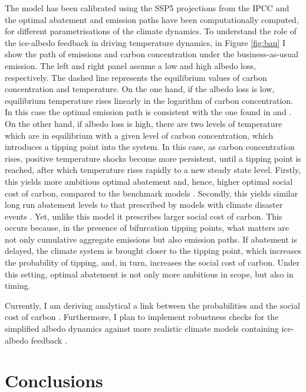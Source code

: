 \documentclass[12pt]{article}
\begin{document}
The model has been calibrated using the SSP5 projections from the IPCC \citep{kriegler_fossil-fueled_2017} and the optimal abatement and emission paths have been computationally computed, for different parametrisations of the climate dynamics. To understand the role of the ice-albedo feedback in driving temperature dynamics, in Figure \ref{fig:bau} I show the path of emissions and carbon concentration under the business-as-usual emission. The left and right panel assume a low and high albedo loss, respectively. The dashed line represents the equilibrium values of carbon concentration and temperature. On the one hand, if the albedo loss is low, equilibrium temperature rises linearly in the logarithm of carbon concentration. In this case the optimal emission path is consistent with the one found in \cite{nordhaus_revisiting_2017} and \cite{hambel_optimal_2021}. On the other hand, if albedo loss is high, there are two levels of temperature which are in equilibrium with a given level of carbon concentration, which introduces a tipping point into the system. In this case, as carbon concentration rises, positive temperature shocks become more persistent, until a tipping point is reached, after which temperature rises rapidly to a new steady state level. Firstly, this yields more ambitious optimal abatement and, hence, higher optimal social cost of carbon, compared to the benchmark models \citep{nordhaus_revisiting_2017,hambel_optimal_2021}. Secondly, this yields similar long run abatement levels to that prescribed by models with climate disaster events \citep{van_den_bremer_risk-adjusted_2021,dietz_economic_2021, lin_social_2023}. Yet, unlike this model it prescribes larger social cost of carbon. This occurs because, in the presence of bifurcation tipping points, what matters are not only cumulative aggregate emissions but also emission paths. If abatement is delayed, the climate system is brought closer to the tipping point, which increases the probability of tipping, and, in turn, increases the social cost of carbon. Under this setting, optimal abatement is not only more ambitious in scope, but also in timing. 

Currently, I am deriving analytical a link between the probabilities and the social cost of carbon \citep{grass_small-noise_2015}. Furthermore, I plan to implement robustness checks for the  simplified albedo dynamics against more realistic climate models containing ice-albedo feedback \citep{seaver_wang_mechanisms_2023}.

\section{Conclusions}
\end{document}
